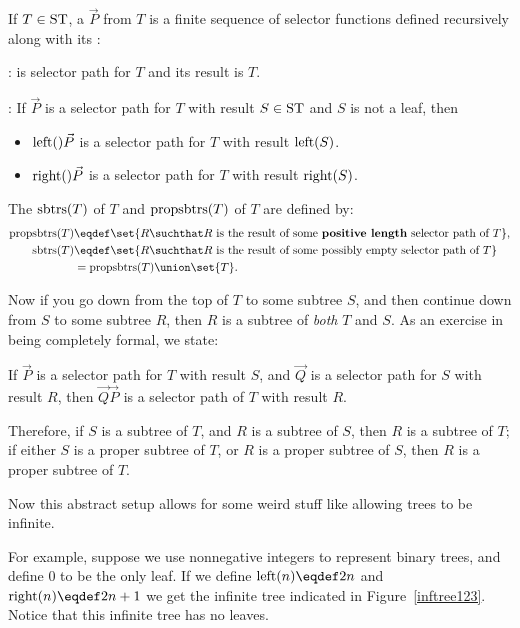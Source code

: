 \begin{definition}
If $T\in\text{ST}$, a  $\vec{P}$ from $T$ is a
finite sequence of selector functions defined recursively along with
its :

: \emptystring is selector path for $T$ and
its result is $T$.

: If $\vec{P}$ is a selector path
for $T$ with result $S \in \text{ST}$ and $S$ is not a leaf, then
\begin{itemize}
\item $\text{left}() \vec{P}$ is a selector path
for $T$ with result $\text{left}(S)$.

\item $\text{right}() \vec{P}$ is a selector path
for $T$ with result $\text{right}(S)$.
\end{itemize}

The  $\text{sbtrs}(T)$ of $T$ and 
$\text{propsbtrs}(T)$ of $T$ are defined by:
\begin{align*}
\psubtr{T} & \eqdef \set{R \suchthat R\ \text{is the result of some
    \textbf{positive length} selector path of}\ T},\\
\subtr{T} & \eqdef \set{R \suchthat R\ \text{is the result of some possibly empty
    selector path of}\ T}\\
          & = \psubtr{T} \union \set{T}.
\end{align*}
\end{definition}

Now if you go down from the top of $T$ to some subtree $S$, and then
continue down from $S$ to some subtree $R$, then $R$ is a subtree of
\emph{both} $T$ and $S$.  As an exercise in being completely formal,
we state:

\begin{lemma}\label{}
If $\vec{P}$ is a selector path for $T$ with result $S$, and
$\vec{Q}$ is a selector path for $S$ with result $R$, then
$\vec{Q}\vec{P}$ is a selector path of $T$ with result $R$.

Therefore, if $S$ is a subtree of $T$, and $R$ is a subtree of $S$,
then $R$ is a subtree of $T$; if either $S$ is a proper subtree of
$T$, or $R$ is a proper subtree of $S$, then $R$ is a proper subtree
of $T$.
\end{lemma}

Now this abstract setup allows for some weird stuff like allowing
trees to be infinite.

  For example, suppose we use nonnegative
integers to represent binary trees, and define 0 to be the only leaf.
If we define $\leftsub{n} \eqdef 2n$ and $\rightsub{n} \eqdef 2n+1$ we
get the infinite tree indicated in Figure~\ref{inftree123}.  Notice
that this infinite tree has no leaves.

